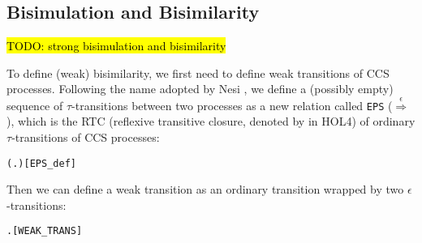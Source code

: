 
\subsection{Bisimulation and Bisimilarity}

\hl{TODO: strong bisimulation and bisimilarity}

To define (weak) bisimilarity, we first need to define weak
transitions of CCS processes. Following the name adopted by Nesi \cite{Nesi:1992ve},
we define a (possibly empty) sequence of $\tau$-transitions between
two processes as
a new relation called \texttt{EPS} ($\overset{\epsilon}{\Rightarrow}$), which is the RTC
(reflexive transitive closure, denoted by \mbox{\color{blue}{$^*$}} in
HOL4) of ordinary $\tau$-transitions of CCS processes:
\begin{alltt}
 \HOLSymConst{=} (\HOLTokenLambda{} .  \HOLTokenTransBegin\HOLSymConst{\ensuremath{\tau}}\HOLTokenTransEnd {})\HOLSymConst{\HOLTokenSupStar{}}\hfill{[EPS_def]}
\end{alltt}
Then we can define a weak transition as an ordinary transition wrapped by
two $\epsilon$-transitions:
\begin{alltt}
 \HOLTokenWeakTransBegin{}\HOLTokenWeakTransEnd {} \HOLSymConst{\HOLTokenEquiv{}} \HOLSymConst{\HOLTokenExists{}} .  \HOLSymConst{\HOLTokenEPS}  \HOLSymConst{\HOLTokenConj{}}  \HOLTokenTransBegin{}\HOLTokenTransEnd {} \HOLSymConst{\HOLTokenConj{}}  \HOLSymConst{\HOLTokenEPS} \hfill{[WEAK_TRANS]}
\end{alltt}


